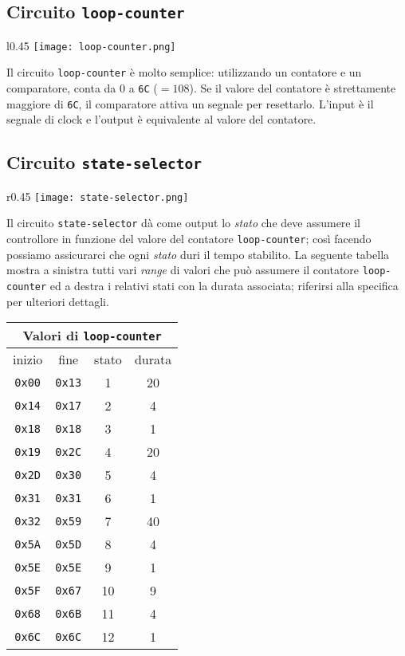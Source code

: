 \documentclass{article}
\def\code#1{\texttt{#1}}
\begin{document}
\subsection{Circuito \code{loop-counter}}
\begin{wrapfigure}{l}{0.45\textwidth}
    \texttt{[image: loop-counter.png]}
\end{wrapfigure}
Il circuito \code{loop-counter} è molto semplice: utilizzando un contatore e un comparatore, conta da 0 a \code{6C} ($= 108$). 
Se il valore del contatore è strettamente maggiore di \code{6C}, il comparatore attiva un segnale per resettarlo. L'input è il segnale di clock e l'output è equivalente al valore del contatore.
\clearpage

\subsection{Circuito \code{state-selector}}

\begin{wrapfigure}[10]{r}{0.45\textwidth}
    \texttt{[image: state-selector.png]}
\end{wrapfigure}
Il circuito \code{state-selector} dà come output lo \textit{stato} che deve assumere il controllore in funzione del valore del contatore \code{loop-counter}; 
così facendo possiamo assicurarci che ogni \textit{stato} duri il tempo stabilito.
La seguente tabella mostra a sinistra tutti vari \textit{range} di valori che può assumere il contatore \code{loop-counter} ed a destra i relativi stati con la durata associata; riferirsi alla specifica per ulteriori dettagli.
\\

\begin{tabular}{|c | c || c | c |}
    \hline
    \multicolumn{4}{|c|}{\textbf{Valori di \code{loop-counter}}} \\ \hline
    inizio & fine & stato & durata \\ \hline
    \code{0x00} & \code{0x13} & 1 & 20 \\ \hline
    \code{0x14} & \code{0x17} & 2 & 4 \\ \hline
    \code{0x18} & \code{0x18} & 3 & 1 \\ \hline
    \code{0x19} & \code{0x2C} & 4 & 20 \\ \hline 
    \code{0x2D} & \code{0x30} & 5 & 4 \\ \hline 
    \code{0x31} & \code{0x31} & 6 & 1 \\ \hline 
    \code{0x32} & \code{0x59} & 7 & 40 \\ \hline 
    \code{0x5A} & \code{0x5D} & 8 & 4 \\ \hline
    \code{0x5E} & \code{0x5E} & 9 & 1 \\ \hline
    \code{0x5F} & \code{0x67} & 10 & 9 \\ \hline 
    \code{0x68} & \code{0x6B} & 11 & 4\\ \hline 
    \code{0x6C} & \code{0x6C} & 12 & 1 \\ \hline 
\end{tabular}
\end{document}
